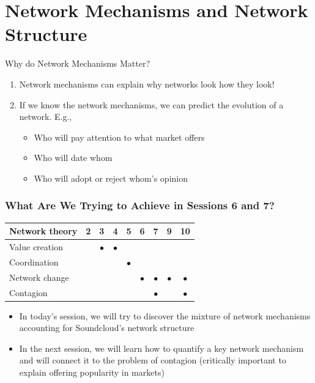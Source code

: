 \documentclass[notes, aspectratio=1610]{beamer}
\begin{document}

\section{Network Mechanisms and Network Structure}

\begin{frame}{Why do Network Mechanisms Matter?}{}
	\begin{enumerate}
		\item Network mechanisms can explain why networks look how 
		they look!
		\item If we know the network mechanisms, we can predict the
		evolution of a network. E.g.,
		\begin{itemize}
			\item 
			Who will pay attention to what market offers
			\item 
			Who will date whom
			\item 
			Who will adopt or reject whom's opinion
		\end{itemize}
	\end{enumerate}
\end{frame}

\begin{frame}
	\frametitle{What Are We Trying to Achieve in Sessions 6 and 7?}
	\begin{table}
		\begin{tabular}[c]{l|c|c|c|c|c|c|c|c}
			\textbf{Network theory} & 
			\textbf{2} & 
			\textbf{3} & 
			\textbf{4} & 
			\textbf{5} & 
			\textbf{6} & 
			\textbf{7} & 
			\textbf{9} & 
			\textbf{10}\\
			\hline
			Value creation &  & $\bullet$ & $\bullet$ &  &  &  &  & \\	
			Coordination &  &  &  & $\bullet$ &  &  &  & \\	
			Network change &  &  &  &  & $\bullet$ & $\bullet$ & $\bullet$ & $\bullet$\\	
			Contagion &  &  &  &  &  & $\bullet$ &  & $\bullet$ \\	
		\end{tabular}
	\end{table}

	\pause

	\begin{itemize}
		\item In today's session, we will try to discover the 
		mixture of network 
		mechanisms accounting for Soundcloud's network structure
		\pause
		\item In the next session, we will learn how to quantify a key 
		network mechanism and will connect it to the problem 
		of contagion (critically important to explain offering 
		popularity in markets)
	\end{itemize}
\end{frame}
\end{document}
